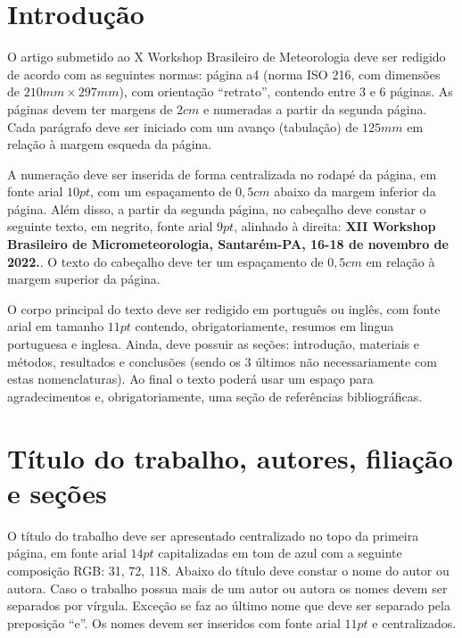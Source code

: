 \documentclass[]{workmicro2022} %
\affil[1]{Curso de Graduação em Meteorologia, UFPEL}
\affil[2]{Curso de Graduação em Meteorologia, UFSC}
\affil[3]{Curso Técnico em Meteorologia, IFSC}
\affil[4]{Departamento de Física, UFSM}
\begin{document}

\corpo  %


\section{Introdução}

\par O artigo submetido ao X Workshop Brasileiro de Meteorologia deve ser redigido de acordo com as seguintes normas: página a4 (norma ISO 216, com dimensões de $210mm\times297mm$), com orientação ``retrato'', contendo entre 3 e 6 páginas. As páginas devem ter margens de $2cm$ e numeradas a partir da segunda página. Cada parágrafo deve ser iniciado com um avanço (tabulação) de $125mm$ em relação à margem esqueda da página.

\par A numeração deve ser inserida de forma centralizada no rodapé da página, em fonte arial $10pt$, com um espaçamento de $0,5cm$ abaixo da margem inferior da página. Além disso, a partir da segunda página, no cabeçalho deve constar o seguinte texto, em negrito, fonte arial $9pt$, alinhado à direita: \textbf{XII Workshop Brasileiro de Micrometeorologia, Santarém-PA, 16-18 de novembro de 2022.}. O texto do cabeçalho deve ter um espaçamento de $0,5cm$ em relação à margem superior da página.

\par O corpo principal do texto deve ser redigido em português ou inglês, com fonte arial em tamanho $11pt$ contendo, obrigatoriamente, resumos em lingua portuguesa e inglesa. Ainda, deve possuir as seções: introdução, materiais e métodos, resultados e conclusões (sendo os 3 últimos não necessariamente com estas nomenclaturas). Ao final o texto poderá usar um espaço para agradecimentos e, obrigatoriamente, uma seção de referências bibliográficas.



\section{Título do trabalho, autores, filiação e seções}

\par O título do trabalho deve ser apresentado centralizado no topo da primeira página, em fonte arial $14pt$ capitalizadas em tom de azul com a seguinte composição RGB: 31, 72, 118. Abaixo do título deve constar o nome do autor ou autora. Caso o trabalho possua mais de um autor ou autora os nomes devem ser separados por vírgula. Exceção se faz ao último nome que deve ser separado pela preposição ``e''. Os nomes devem ser inseridos com fonte arial $11pt$ e centralizados.
\end{document}
